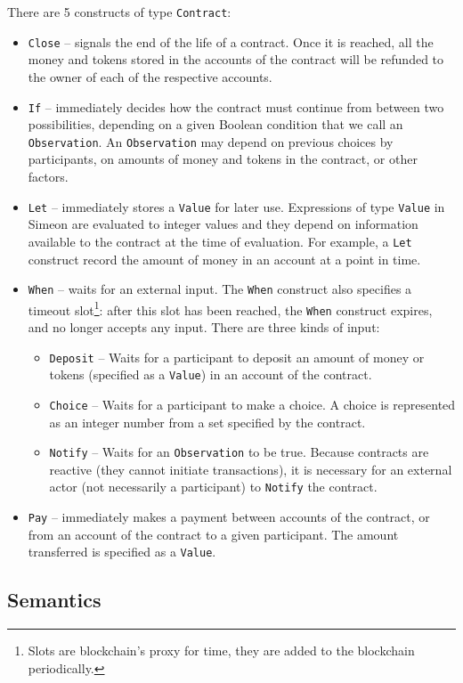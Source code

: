 \documentclass[english,runningheads]{llncs}
\begin{document}
There are 5 constructs of type \texttt{Contract}:
\begin{itemize}
\item \texttt{Close} -- signals the end of the life of a contract. Once
it is reached, all the money and tokens stored in the accounts of
the contract will be refunded to the owner of each of the respective
accounts.
\item \texttt{If} -- immediately decides how the contract must continue
from between two possibilities, depending on a given Boolean condition
that we call an \texttt{Observation}. An \texttt{Observation}
may depend on previous choices by participants, on amounts of money
and tokens in the contract, or other factors.
\item \texttt{Let} -- immediately stores a \texttt{Value} for later use.
Expressions of type \texttt{Value} in Simeon are evaluated to integer
values and they depend on information available to the contract at the
time of evaluation. For example, a \texttt{Let} construct record
the amount of money in an account at a point in time.
\item \texttt{When} -- waits for an external input. The \texttt{When} construct
also specifies a timeout slot\footnote{Slots are blockchain's proxy for time,
they are added to the blockchain periodically.}: after this slot has been reached, the
\texttt{When} construct expires, and no longer accepts any input.
There are three kinds of input:
\begin{itemize}
\item \texttt{Deposit} -- Waits for a participant to deposit an amount
of money or tokens (specified as a \texttt{Value}) in an account of the contract.
\item \texttt{Choice} -- Waits for a participant to make a choice. A choice
is represented as an integer number from a set specified by the contract.
\item \texttt{Notify} -- Waits for an \texttt{Observation} to be true.
Because contracts are reactive (they cannot initiate transactions),
it is necessary for an external actor (not necessarily a participant)
to \texttt{Notify} the contract.
\end{itemize}
\item \texttt{Pay} -- immediately makes a payment between accounts of the
contract, or from an account of the contract to a given participant.
The amount transferred is specified as a \texttt{Value}.
\end{itemize}

\subsection{Semantics\label{subsec:Simeon-Semantics}}
\end{document}
